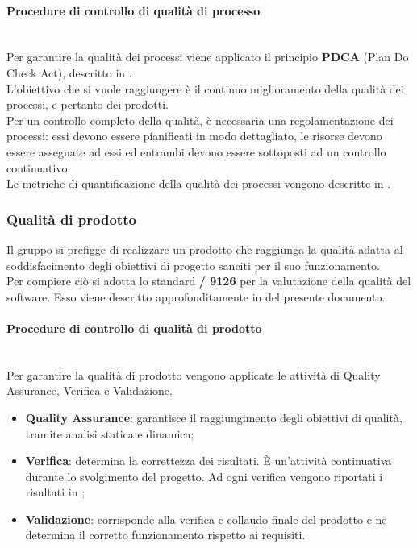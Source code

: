 \paragraph{Procedure di controllo di qualità di processo}\mbox{}\\
Per garantire la qualità dei processi viene applicato il principio \textbf{PDCA} (Plan Do Check Act), descritto in .\\ 
L'obiettivo che si vuole raggiungere è il continuo miglioramento della qualità dei processi, e pertanto dei prodotti.\\
Per un controllo completo della qualità, è necessaria una regolamentazione dei processi: essi devono essere pianificati in modo dettagliato, le risorse devono essere assegnate ad essi ed entrambi devono essere sottoposti ad un controllo continuativo.\\
Le metriche di quantificazione della qualità dei processi vengono descritte in .

\subsubsection{Qualità di prodotto}
Il gruppo si prefigge di realizzare un prodotto che raggiunga la qualità adatta al soddisfacimento degli obiettivi di progetto sanciti per il suo funzionamento.\\
Per compiere ciò si adotta lo standard \textbf{/ 9126} per la valutazione della qualità del software. Esso viene descritto approfonditamente in  del presente documento.

\paragraph{Procedure di controllo di qualità di prodotto}\mbox{}\\
Per garantire la qualità di prodotto vengono applicate le attività di Quality Assurance, Verifica e Validazione.
\begin{itemize}
	\item \textbf{Quality Assurance}: garantisce il raggiungimento degli obiettivi di qualità, tramite analisi statica e dinamica;
	\item \textbf{Verifica}: determina la correttezza dei risultati. \`{E} un’attività continuativa durante lo svolgimento del progetto. Ad ogni verifica vengono riportati i risultati in ;
	\item \textbf{Validazione}: corrisponde alla verifica e collaudo finale del prodotto e ne determina il corretto funzionamento rispetto ai requisiti.
\end{itemize}

